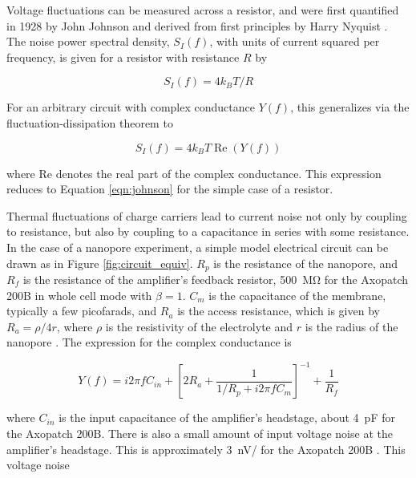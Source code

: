 Voltage fluctuations can be measured across a resistor, and were first quantified in 1928 by John Johnson \citep{Johnson1928} and derived from first principles by Harry Nyquist \citep{Nyquist1928}.  The noise power spectral density, $S_I (f)$, with units of current squared per frequency, is given for a resistor with resistance $R$ by

\begin{equation}
S_I(f) = 4 k_B T / R
\label{eqn:johnson}
\end{equation}

For an arbitrary circuit with complex conductance $Y(f)$, this generalizes via the fluctuation-dissipation theorem to \citep{Kogan1996, Hoogerheide2010, Sakmann1995}

\begin{equation}
S_I(f) = 4 k_B T \operatorname{Re}(Y(f))
\label{eqn:general}
\end{equation}

\noindent
where Re denotes the real part of the complex conductance.  This expression reduces to Equation \ref{eqn:johnson} for the simple case of a resistor.

Thermal fluctuations of charge carriers lead to current noise not only by coupling to resistance, but also by coupling to a capacitance in series with some resistance.  In the case of a nanopore experiment, a simple model electrical circuit can be drawn as in Figure \ref{fig:circuit_equiv}.  $R_p$ is the resistance of the nanopore, and $R_f$ is the resistance of the amplifier's feedback resistor, \SI{500}{\mega\ohm} for the Axopatch 200B in whole cell mode with $\beta = 1$.  $C_m$ is the capacitance of the membrane, typically a few picofarads, and $R_a$ is the access resistance, which is given by $R_a = \rho/4r$, where $\rho$ is the resistivity of the electrolyte and $r$ is the radius of the nanopore \citep{Hall1975}.  The expression for the complex conductance is

\begin{equation}
Y(f) = i 2 \pi f C_{in} + \left[ 2 R_a + \frac{1}{ 1/R_p + i 2 \pi f C_m } \right]^{-1} + \frac{1}{R_f}
\label{eqn:admittance_model}
\end{equation}

\noindent
where $C_{in}$ is the input capacitance of the amplifier's headstage, about \SI{4}{\pF} for the Axopatch 200B.  There is also a small amount of input voltage noise at the amplifier's headstage.  This is approximately \SI{3}{\nV/\sqrt{\Hz}} for the Axopatch 200B \citep{Sakmann1995}.  This voltage noise 

